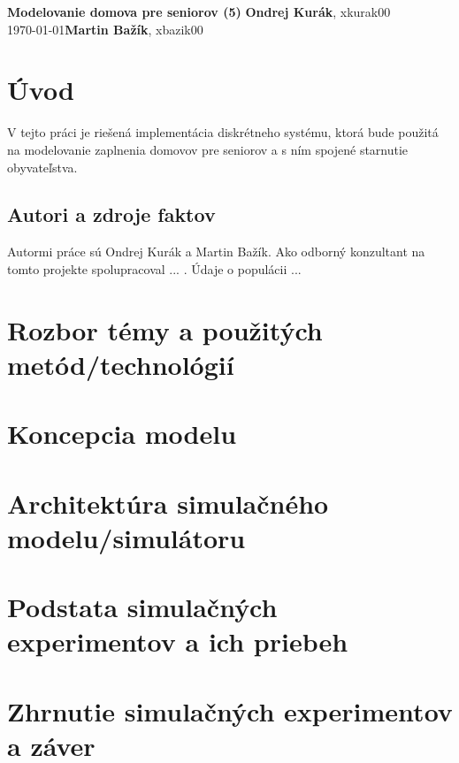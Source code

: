 \documentclass[a4paper, 11pt]{article}
\begin{document}
\noindent
\large\textbf{Modelovanie domova pre seniorov (5)} \hfill \textbf{Ondrej Kurák}, xkurak00 \\
\today \hfill \textbf{Martin Bažík}, xbazik00 \\


\section{Úvod}
V tejto práci je riešená implementácia diskrétneho systému, ktorá bude použitá na modelovanie zaplnenia domovov pre seniorov a s ním spojené starnutie obyvateľstva. %

\subsection{Autori a zdroje faktov}
Autormi práce sú Ondrej Kurák a Martin Bažík. Ako odborný konzultant na tomto projekte spolupracoval ... .
Údaje o populácii ...



\section{Rozbor témy a použitých metód/technológií}

\section{Koncepcia modelu}

\section{Architektúra simulačného modelu/simulátoru}

\section{Podstata simulačných experimentov a ich priebeh}

\section{Zhrnutie simulačných experimentov a záver}
\end{document}
